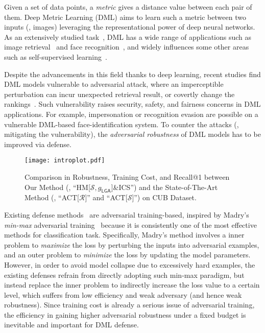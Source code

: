 \documentclass[10pt,twocolumn,letterpaper]{article}
\begin{document}

Given a set of data points, a \emph{metric} gives a distance value between each
pair of them.
%
Deep Metric Learning (DML) aims to learn such a metric between two inputs (\eg,
images) leveraging the representational power of deep neural networks.
%
As an extensively studied task~\cite{revisiting,dmlreality}, DML has a wide
range of applications such as image retrieval~\cite{imagesim2} and face
recognition~\cite{facenet,domainface}, and widely influences some other areas
such as self-supervised learning~\cite{dmlreality}.

Despite the advancements in this field thanks to deep learning, recent studies
find DML models vulnerable to adversarial attack, where an imperceptible
perturbation can incur unexpected retrieval result, or covertly change the
rankings~\cite{advrank,advorder}.
%
Such vulnerability raises security, safety, and fairness concerns in DML
applications.
%
For example, impersonation or recognition evasion are possible on a vulnerable
DML-based face-identification system.
%
To counter the attacks (\ie, mitigating the vulnerability), the
\emph{adversarial robustness} of DML models has to be improved via defense.

\begin{figure}[t]
	\texttt{[image: introplot.pdf]}
	\caption{
		Comparison in Robustness, Training Cost, and Recall@1 
		between Our Method (\ie, ``HM[$\mathcal{S},g_\mathsf{LGA}$]\&ICS'')
		and the State-of-The-Art Method (\ie, ``ACT[$\mathcal{R}$]'' and
		``ACT[$\mathcal{S}$]'') on CUB Dataset.
	}
	\label{fig:introplot}
\end{figure}


Existing defense methods~\cite{advrank,robrank} are adversarial training-based,
inspired by Madry's \emph{min-max} adversarial training~\cite{madry} because it
is consistently one of the most effective methods for classification task.
%
Specifically, Madry's method involves a inner problem to \emph{maximize} the
loss by perturbing the inputs into adversarial examples, and an outer problem
to \emph{minimize} the loss by updating the model parameters.
%
However, in order to avoid model collapse due to excessively hard examples, the
existing defenses refrain from directly adopting such min-max paradigm, but
instead replace the inner problem to indirectly increase the loss value to a
certain level, which suffers from low efficiency and weak adversary (and hence
weak robustness).
%
Since training cost is already a serious issue of adversarial training, the
efficiency in gaining higher adversarial robustness under a fixed budget is
inevitable and important for DML defense.
\end{document}
